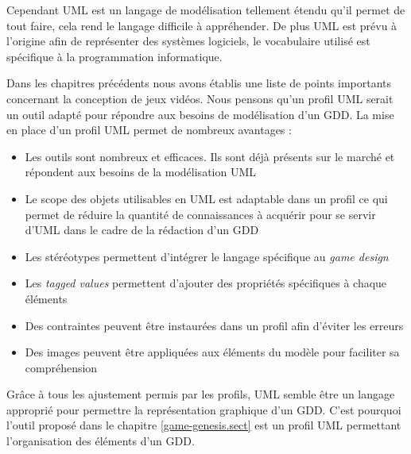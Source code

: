 Cependant UML est un langage de modélisation tellement étendu qu'il permet de tout faire, cela rend le langage difficile à appréhender.
De plus UML est prévu à l'origine afin de représenter des systèmes logiciels, le vocabulaire utilisé est spécifique à la programmation informatique.


Dans les chapitres précédents nous avons établis une liste de points importants concernant la conception de jeux vidéos.
Nous pensons qu'un profil UML serait un outil adapté pour répondre aux besoins de modélisation d'un GDD.
La mise en place d'un profil UML permet de nombreux avantages :
\begin{itemize}
    \item Les outils sont nombreux et efficaces. Ils sont déjà présents sur le marché et répondent aux besoins de la modélisation UML
    \item Le scope des objets utilisables en UML est adaptable dans un profil ce qui permet de réduire la quantité de connaissances à acquérir pour se servir d'UML dans le cadre de la rédaction d'un GDD
    \item Les stéréotypes permettent d'intégrer le langage spécifique au \emph{game design}
    \item Les \emph{tagged values} permettent d'ajouter des propriétés spécifiques à chaque éléments
    \item Des contraintes peuvent être instaurées dans un profil afin d'éviter les erreurs
    \item Des images peuvent être appliquées aux éléments du modèle pour faciliter sa compréhension
\end{itemize}


Grâce à tous les ajustement permis par les profils, UML semble être un langage approprié pour permettre la représentation graphique d'un GDD.
C'est pourquoi l'outil proposé dans le chapitre \ref{game-genesis.sect} est un profil UML permettant l'organisation des éléments d'un GDD.
